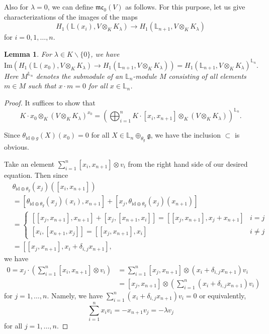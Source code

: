 \documentclass[a4paper,12pt]{article}
\newtheorem{lem}[thm]{Lemma}
\theoremstyle{definition}
\theoremstyle{remark}
\begin{document}
Also for $\lambda=0$, we can define $\mathfrak{mc}_{0}(V)$ as follows. 
For this purpose, let us give characterizations of the images of the maps
\[
	H_1(\mathbb{L}(x_{i}), V\otimes_{K} K_{\lambda})\to H_1(\mathbb{L}_{n+1}, V\otimes_{K} K_{\lambda})
\]
for $i=0,1,\ldots,n$.
\begin{lem}\label{lem:Linvariant}
	For $\lambda\in K\backslash\{0\}$, we have 
	\[
	\mathrm{Im}\left(
		H_1(\mathbb{L}(x_{0}), V\otimes_{K} K_{\lambda})\to H_1(\mathbb{L}_{n+1}, V\otimes_{K} K_{\lambda})
	\right)
	=
	H_1(\mathbb{L}_{n+1}, V\otimes_{K} K_{\lambda})	
	^{\mathbb{L}_{n}}.
	\]
	Here $M^{\mathbb{L}_{n}}$ denotes the submodule of an $\mathbb{L}_{n}$-module $M$ consisting of all elements $m\in M$ such that $x\cdot m=0$ for all $x\in \mathbb{L}_{n}$.
\end{lem}
\begin{proof}
It suffices to show that 
\[
	K\cdot x_{0}\otimes_{K} (V\otimes_{K} K_{\lambda})^{x_{0}}
	= \left(
	\bigoplus_{i=1}^{n}K\cdot [x_{i},x_{n+1}]\otimes_{K}(V\otimes_{K} K_{\lambda})
	\right)^{\mathbb{L}_{n}}.
\]

Since $\theta_{\mathrm{id}\oplus g}(X)(x_{0})=0$ for all $X\in \mathbb{L}_{n}\oplus_{\theta_{g}}\mathfrak{g}$, we have 
the inclusion $\subset$ is obvious.

Take an element $\sum_{i=1}^{n} [x_i, x_{n+1}]\otimes v_i
$ from the right hand side of our desired equation.
Then since
\begin{equation}\label{eq:DRformula}
\begin{aligned}
	&\theta_{\mathrm{id}\oplus \theta_{g}}(x_{j})([x_{i},x_{n+1}])\\
	&=[\theta_{\mathrm{id}\oplus \theta_{g}}(x_{j})(x_{i}),x_{n+1}]+[x_{j},\theta_{\mathrm{id}\oplus \theta_{g}}(x_{j})(x_{n+1})]\\
	&=\begin{cases}
	[[x_{j},x_{n+1}],x_{n+1}]+[x_{j},[x_{n+1},x_{i}]]=[[x_{j},x_{n+1}],x_{j}+x_{n+1}]&i=j\\
	[x_{i},[x_{n+1},x_{j}]]=[[x_{j},x_{n+1}],x_{i}]&i\neq j
	\end{cases}\\
	&=[[x_{j},x_{n+1}],x_{i}+\delta_{i,j}x_{n+1}],
\end{aligned}
\end{equation}
we have 
\begin{align*}
	0=x_{j}\cdot \left(\sum_{i=1}^{n} [x_i, x_{n+1}]\otimes v_i\right)
	&=\sum_{i=1}^{n} [x_j, x_{n+1}]\otimes (x_{i}+\delta_{i,j}x_{n+1})v_i\\
	&=[x_{j},x_{n+1}]\otimes \left(\sum_{i=1}^{n} (x_{i}+\delta_{i,j}x_{n+1})v_i\right)
\end{align*}
for $j=1,\ldots,n$.
Namely, we have 
$
	\sum_{i=1}^{n} (x_{i}+\delta_{i,j}x_{n+1})v_i=0
$
or equivalently, 
\[
	\sum_{i=1}^{n} x_{i}v_i=-x_{n+1}v_j=-\lambda v_j
\]
for all $j=1,\ldots,n$.


\end{proof}
\end{document}

